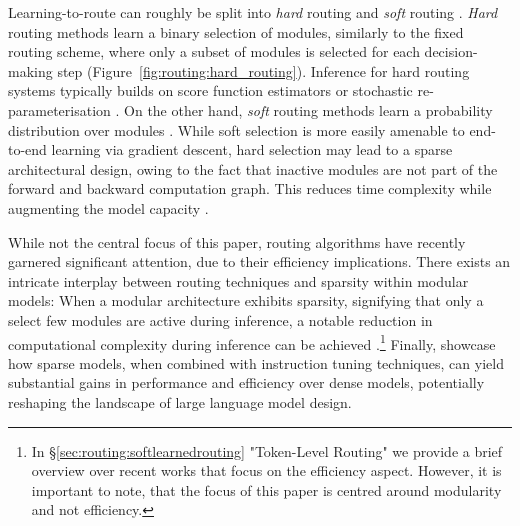\documentclass[10pt]{article} %
\begin{document}
Learning-to-route can roughly be split into \textit{hard} routing  and \textit{soft} routing \citep{rosenbaum2019routing}. \textit{Hard} routing methods learn a binary selection of modules, similarly to the fixed routing scheme, where only a subset of modules is selected for each decision-making step (Figure~\ref{fig:routing:hard_routing}). Inference for hard routing systems typically builds on score function estimators \citep{willianms1988toward, williams1992simple} or stochastic re-parameterisation \citep{Jang2017Gumbel}. On the other hand, \textit{soft} routing methods learn a probability distribution over modules \citep[Figure~\ref{fig:routing:soft_routing}; ][]{jacobs1991task}.
While soft selection is more easily amenable to end-to-end learning via gradient descent,
hard selection may lead to a sparse architectural design, owing to the fact that inactive modules are not part of the forward and backward computation graph.
This reduces time complexity while augmenting the model capacity \citep{bengio2013estimating}.

While not the central focus of this paper, routing algorithms  have recently garnered significant attention, due to their efficiency implications. There exists an intricate interplay between routing techniques and sparsity within modular models: When a modular architecture exhibits sparsity, signifying that only a select few modules are active during inference,  a notable reduction in computational complexity during inference can be achieved \citep{fedus2022review}.\footnote{In \S \ref{sec:routing:softlearnedrouting} "Token-Level Routing" we provide a brief overview over recent works that focus on the efficiency aspect. However, it is important to note, that the focus of this paper is centred around modularity and not efficiency.} 
Finally, \citet{shen2023mixtureofexperts, jang2023exploring} showcase how sparse models, when combined with instruction tuning techniques, can yield substantial gains in performance and efficiency over dense models, potentially reshaping the landscape of large language model design. 
\end{document}
